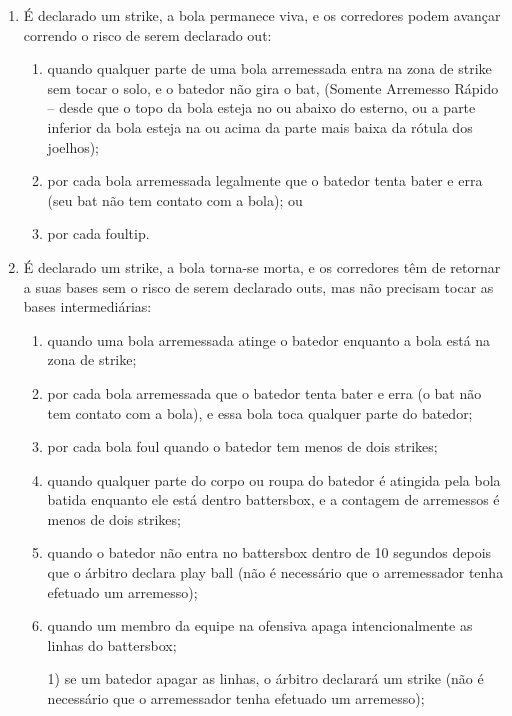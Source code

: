 \begin{enumerate}[label=(\alph*)]
	\item  É declarado um \gls{strike}, a bola permanece viva, e os corredores podem avançar correndo o risco de serem declarado \gls{out}:

	\begin{enumerate}[label=\roman*.]
		\item  quando qualquer parte de uma bola arremessada entra na zona de \gls{strike} sem tocar o solo, e o batedor não gira o \gls{bat}, (Somente Arremesso Rápido -- desde que o topo da bola esteja no ou abaixo do esterno, ou a parte inferior da bola esteja na ou acima da parte mais baixa da rótula dos joelhos);
		\item por cada bola arremessada legalmente que o batedor tenta bater e erra (seu \gls{bat} não tem contato com a bola); ou
		\item por cada \gls{foultip}.
	\end{enumerate}

	\item  É declarado um \gls{strike}, a bola torna-se morta, e os corredores têm de retornar a suas bases sem o risco de serem declarado \gls{out}s, mas não precisam tocar  as bases intermediárias:

	\begin{enumerate}[label=\roman*.]
		\item quando uma bola arremessada atinge o batedor enquanto a bola está na zona  de \gls{strike};
		\item por cada bola arremessada que o batedor tenta bater e erra (o \gls{bat} não tem contato com a bola), e essa bola toca qualquer parte do batedor;
		\item por cada bola \gls{foul} quando o batedor tem menos de dois \glspl{strike};
		\item quando qualquer parte do corpo ou roupa do batedor é atingida pela bola batida enquanto ele está dentro \gls{battersbox}, e a contagem de arremessos é menos de dois \glspl{strike};
		\item quando o batedor não entra no \gls{battersbox} dentro de 10 segundos depois que o árbitro declara \gls{play ball} (não é necessário que o arremessador tenha efetuado um arremesso);
		\item quando um membro da equipe na ofensiva apaga intencionalmente as linhas do \gls{battersbox};

		1) se um batedor apagar as linhas, o árbitro declarará um \gls{strike} (não é necessário que o arremessador tenha efetuado um arremesso);


\end{enumerate}
\end{enumerate}
